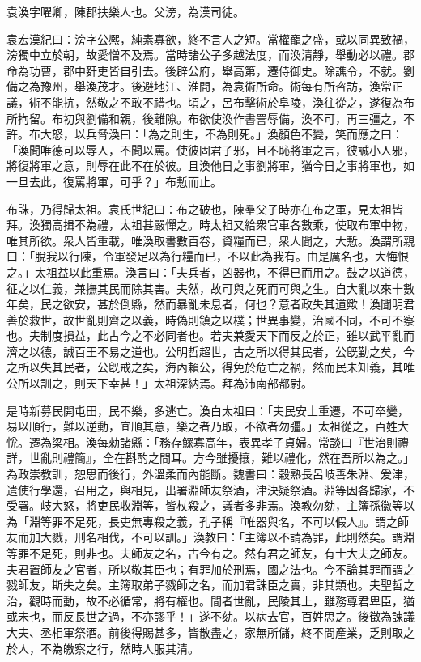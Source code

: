 
\begin{pinyinscope}
袁渙字曜卿，陳郡扶樂人也。父滂，為漢司徒。

袁宏漢紀曰：滂字公熈，純素寡欲，終不言人之短。當權寵之盛，或以同異致禍，滂獨中立於朝，故愛憎不及焉。當時諸公子多越法度，而渙清靜，舉動必以禮。郡命為功曹，郡中姧吏皆自引去。後辟公府，舉高第，遷侍御史。除譙令，不就。劉備之為豫州，舉渙茂才。後避地江、淮間，為袁術所命。術每有所咨訪，渙常正議，術不能抗，然敬之不敢不禮也。頃之，呂布擊術於阜陵，渙往從之，遂復為布所拘留。布初與劉備和親，後離隙。布欲使渙作書詈辱備，渙不可，再三彊之，不許。布大怒，以兵脅渙曰：「為之則生，不為則死。」渙顏色不變，笑而應之曰：「渙聞唯德可以辱人，不聞以罵。使彼固君子邪，且不恥將軍之言，彼誠小人邪，將復將軍之意，則辱在此不在於彼。且渙他日之事劉將軍，猶今日之事將軍也，如一旦去此，復罵將軍，可乎？」布慙而止。

布誅，乃得歸太祖。袁氏世紀曰：布之破也，陳羣父子時亦在布之軍，見太祖皆拜。渙獨高揖不為禮，太祖甚嚴憚之。時太祖又給衆官車各數乘，使取布軍中物，唯其所欲。衆人皆重載，唯渙取書數百卷，資糧而已，衆人聞之，大慙。渙謂所親曰：「脫我以行陳，令軍發足以為行糧而已，不以此為我有。由是厲名也，大悔恨之。」太祖益以此重焉。渙言曰：「夫兵者，凶器也，不得已而用之。鼓之以道德，征之以仁義，兼撫其民而除其害。夫然，故可與之死而可與之生。自大亂以來十數年矣，民之欲安，甚於倒縣，然而暴亂未息者，何也？意者政失其道歟！渙聞明君善於救世，故世亂則齊之以義，時偽則鎮之以樸；世異事變，治國不同，不可不察也。夫制度損益，此古今之不必同者也。若夫兼愛天下而反之於正，雖以武平亂而濟之以德，誠百王不易之道也。公明哲超世，古之所以得其民者，公旣勤之矣，今之所以失其民者，公旣戒之矣，海內賴公，得免於危亡之禍，然而民未知義，其唯公所以訓之，則天下幸甚！」太祖深納焉。拜為沛南部都尉。

是時新募民開屯田，民不樂，多逃亡。渙白太祖曰：「夫民安土重遷，不可卒變，易以順行，難以逆動，宜順其意，樂之者乃取，不欲者勿彊。」太祖從之，百姓大恱。遷為梁相。渙每勑諸縣：「務存鰥寡高年，表異孝子貞婦。常談曰『世治則禮詳，世亂則禮簡』，全在斟酌之間耳。方今雖擾攘，難以禮化，然在吾所以為之。」為政崇教訓，恕思而後行，外溫柔而內能斷。魏書曰：穀熟長呂岐善朱淵、爰津，遣使行學還，召用之，與相見，出署淵師友祭酒，津決疑祭酒。淵等因各歸家，不受署。岐大怒，將吏民收淵等，皆杖殺之，議者多非焉。渙教勿劾，主簿孫徽等以為「淵等罪不足死，長吏無專殺之義，孔子稱『唯器與名，不可以假人』。謂之師友而加大戮，刑名相伐，不可以訓。」渙教曰：「主簿以不請為罪，此則然矣。謂淵等罪不足死，則非也。夫師友之名，古今有之。然有君之師友，有士大夫之師友。夫君置師友之官者，所以敬其臣也；有罪加於刑焉，國之法也。今不論其罪而謂之戮師友，斯失之矣。主簿取弟子戮師之名，而加君誅臣之實，非其類也。夫聖哲之治，觀時而動，故不必循常，將有權也。間者世亂，民陵其上，雖務尊君卑臣，猶或未也，而反長世之過，不亦謬乎！」遂不劾。以病去官，百姓思之。後徵為諫議大夫、丞相軍祭酒。前後得賜甚多，皆散盡之，家無所儲，終不問產業，乏則取之於人，不為皦察之行，然時人服其清。


\end{pinyinscope}
